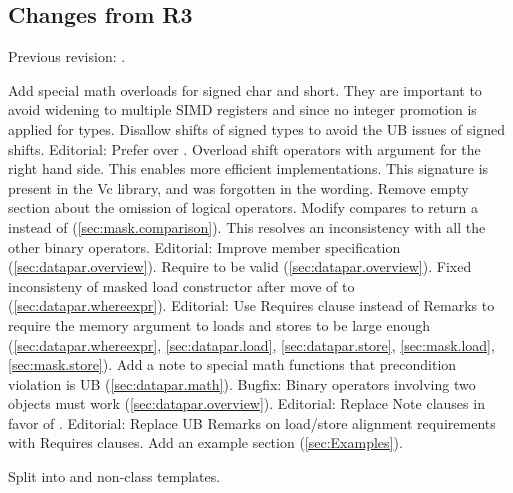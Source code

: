 \subsection{Changes from R3}
Previous revision: \parencite{P0214R3}.
\begin{itemize}
  \chck Add special math overloads for signed char and short.
        They are important to avoid widening to multiple SIMD registers and since no integer promotion is applied for \datapar types.
  \chck Disallow shifts of signed types to avoid the UB issues of signed shifts.
  \chck Editorial: Prefer  over .
  \chck Overload shift operators with \intt argument for the right hand side.
        This enables more efficient implementations.
        This signature is present in the Vc library, and was forgotten in the wording.
  \chck Remove empty section about the omission of logical operators.
  \chck Modify \mask compares to return a \mask instead of \bool (\ref{sec:mask.comparison}).
        This resolves an inconsistency with all the other binary operators.
  \chck Editorial: Improve  member specification (\ref{sec:datapar.overview}).
  \chck Require  to be valid (\ref{sec:datapar.overview}).
  \chck Fixed inconsisteny of masked load constructor after move of  to  (\ref{sec:datapar.whereexpr}).
  \chck Editorial: Use Requires clause instead of Remarks to require the memory argument to loads and stores to be large enough (\ref{sec:datapar.whereexpr}, \ref{sec:datapar.load}, \ref{sec:datapar.store}, \ref{sec:mask.load}, \ref{sec:mask.store}).
  \chck Add a note to special math functions that precondition violation is UB (\ref{sec:datapar.math}).
  \chck Bugfix: Binary operators involving two  objects must work (\ref{sec:datapar.overview}).
  \chck Editorial: Replace Note clauses in favor of \wgNote{}.
  \chck Editorial: Replace UB Remarks on load/store alignment requirements with Requires clauses.
  \chck Add an example section (\ref{sec:Examples}).

  \todo Split \whereexpression into \const and non-\const class templates.
\end{itemize}







